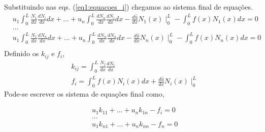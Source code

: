 %
Substituindo nas eqs. (\ref{eq1:equacoes_i}) chegamos ao sistema final de equações.
%
\begin{equation*}
	\begin{split}
		& u_1 \int_0^L \frac{N_1}{dx} \frac{dN_i}{dx} dx + ... + u_n \int_0^L \frac{d N_n}{dx} \frac{dN_i}{dx} dx -  \frac{d \hat u}{dx} N_1(x) \mid_0^L -\int_0^L f(x) N_1(x) dx  = 0\\
		&...\\
		& u_1 \int_0^L \frac{N_1}{dx} \frac{dN_n}{dx} dx + ... + u_n \int_0^L \frac{d N_n}{dx} \frac{dN_n}{dx} dx -  \frac{d \hat u}{dx} N_n(x) \mid_0^L -\int_0^L f(x) N_n(x) dx  = 0\\
	\end{split}
\end{equation*}
%
Definido os $k_{ij}$ e $f_{i}$, 
\begin{equation}
	\begin{split}
	&k_{ij} = \int_0^L \frac{N_j}{dx} \frac{dN_i}{dx}\\
	&f_{i} = \int_0^L f(x) N_i(x) dx + \frac{d \hat u}{dx} N_i(x) \mid_0^L
	\end{split}
\end{equation}
%
Pode-se escrever os sistema de equações final como,

\begin{equation}
	\begin{split}
		& u_1 k_{11} + ... + u_n k_{1n} -  f_i  = 0\\
		&...\\
		& u_1 k_{n1} + ... + u_n k_{nn} -  f_n  = 0
	\end{split}
\end{equation}
